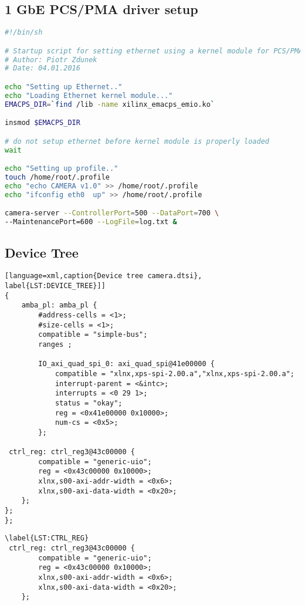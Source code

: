 \subsection{1 GbE PCS/PMA driver setup}
\label{APP:PCS_PMA}

\begin{lstlisting}[language=bash]
#!/bin/sh

# Startup script for setting ethernet using a kernel module for PCS/PMA
# Author: Piotr Zdunek
# Date: 04.01.2016

echo "Setting up Ethernet.."
echo "Loading Ethernet kernel module..."
EMACPS_DIR=`find /lib -name xilinx_emacps_emio.ko`

insmod $EMACPS_DIR

# do not setup ethernet before kernel module is properly loaded
wait

echo "Setting up profile.."
touch /home/root/.profile
echo "echo CAMERA v1.0" >> /home/root/.profile
echo "ifconfig eth0  up" >> /home/root/.profile

camera-server --ControllerPort=500 --DataPort=700 \ 
--MaintenancePort=600 --LogFile=log.txt &

\end{lstlisting}

\subsection{Device Tree}
\label{LST:DEVICE_TREE}

\begin{lstlisting}[language=xml,caption{Device tree camera.dtsi}, label{LST:DEVICE_TREE}]]
{
    amba_pl: amba_pl {
        #address-cells = <1>;
        #size-cells = <1>;
        compatible = "simple-bus";
        ranges ;

        IO_axi_quad_spi_0: axi_quad_spi@41e00000 {
            compatible = "xlnx,xps-spi-2.00.a","xlnx,xps-spi-2.00.a";
            interrupt-parent = <&intc>;
            interrupts = <0 29 1>;
            status = "okay";
            reg = <0x41e00000 0x10000>;
            num-cs = <0x5>;
        };

 ctrl_reg: ctrl_reg3@43c00000 {
        compatible = "generic-uio";
        reg = <0x43c00000 0x10000>;
        xlnx,s00-axi-addr-width = <0x6>;
        xlnx,s00-axi-data-width = <0x20>;
    };
};
};
\end{lstlisting}

\label{LST:REG}
\begin{lstlisting}
\label{LST:CTRL_REG}
 ctrl_reg: ctrl_reg3@43c00000 {
        compatible = "generic-uio";
        reg = <0x43c00000 0x10000>;
        xlnx,s00-axi-addr-width = <0x6>;
        xlnx,s00-axi-data-width = <0x20>;
    };

\end{lstlisting}



